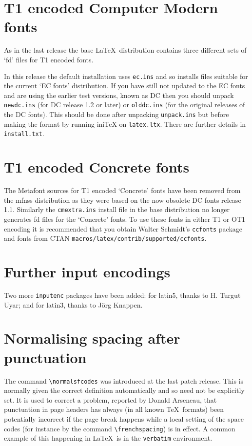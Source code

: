 \documentclass{ltnews}
\providecommand\pkg[1]{\texttt{#1}}
\providecommand\env[1]{\texttt{#1}}
\providecommand\file[1]{\texttt{#1}}
\begin{document}
\maketitle

\section{T1 encoded Computer Modern fonts}
As  in the last release the base \LaTeX\ distribution contains
three different sets of `fd' files for T1 encoded fonts.

In this release the default installation uses \file{ec.ins}
and so installs files suitable for the current `EC fonts'
distribution. If you have still not updated to the EC fonts and
are using the earlier test versions, known as DC then you should
unpack \file{newdc.ins} (for DC release 1.2 or later) or
\file{olddc.ins} (for the original releases of the DC fonts).
This should be done after unpacking \file{unpack.ins} but
before making the format by running ini\TeX{} on \file{latex.ltx}.
There are further details in \file{install.txt}.


\section{T1 encoded Concrete fonts}
The Metafont sources for T1 encoded `Concrete' fonts have been
removed from the \textsf{mfnss} distribution as they were based
on the now obsolete DC fonts release 1.1. Similarly the
\file{cmextra.ins} install file in the \textsf{base} distribution no
longer generates fd files for the `Concrete' fonts.
To use these fonts in either T1 or OT1 encoding it is
recommended that you obtain Walter Schmidt's \pkg{ccfonts} package
and fonts from CTAN \file{macros/latex/contrib/supported/ccfonts}.


\section{Further input encodings}
Two more \pkg{inputenc} packages have been added: for latin5,
thanks to H. Turgut Uyar; and for latin3, thanks to J\"org Knappen.


\section{Normalising spacing after punctuation}
The command \verb|\normalsfcodes| was introduced at the last patch
release. This is normally given the correct definition automatically
and so need not be explicitly set. It is used to correct a problem,
reported by Donald Arseneau, that punctuation in page headers has
always (in all known \TeX\ formats) been potentially incorrect if the
page break happens while a local setting of the space codes (for
instance by the command \verb|\frenchspacing|) is in effect. A common
example of this happening in \LaTeX\ is in the \env{verbatim}
environment.
\end{document}
